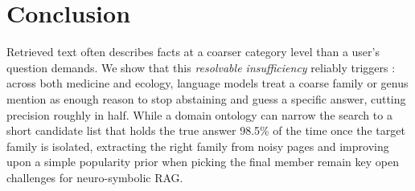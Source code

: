 \section{Conclusion}

Retrieved text often describes facts at a coarser category level than a user's question demands. We show that this \emph{resolvable insufficiency} reliably triggers \clade{}: across both medicine and ecology, language models treat a coarse family or genus mention as enough reason to stop abstaining and guess a specific answer, cutting precision roughly in half. While a domain ontology can narrow the search to a short candidate list that holds the true answer 98.5\% of the time once the target family is isolated, extracting the right family from noisy pages and improving upon a simple popularity prior when picking the final member remain key open challenges for neuro-symbolic RAG.